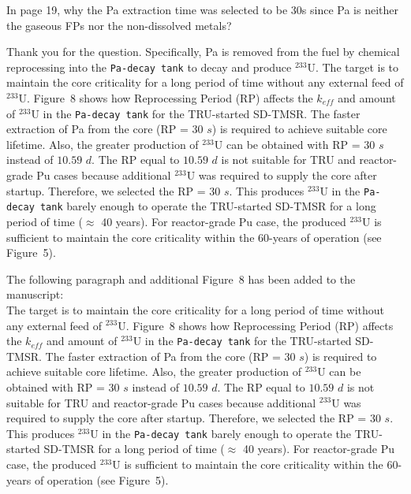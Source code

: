 \documentclass[answers,11pt]{exam}
\begin{document}
\begin{questions}
        \question In page 19, why the Pa extraction time was selected to be 30s since Pa is neither the gaseous FPs nor the non-dissolved metals?
        \begin{solution}
                  Thank you for the question. Specifically, Pa is removed from the fuel by chemical reprocessing into the \texttt{Pa-decay tank} to decay and produce $^{233}$U. The target is to maintain the core criticality for a long period of time without any external feed of $^{233}$U. Figure~8 shows how Reprocessing Period (RP) affects the $k_{eff}$ and amount of $^{233}$U in the \texttt{Pa-decay tank} for the TRU-started SD-TMSR. The faster extraction of Pa from the core (RP = $30$ $s$) is required to achieve suitable core lifetime. Also, the greater production of $^{233}$U can be obtained with RP = $30$ $s$ instead of $10.59$ $d$. The RP equal to $10.59$ $d$ is not suitable for TRU and reactor-grade Pu cases because additional $^{233}$U was required to supply the core after startup. Therefore, we selected the RP = $30$ $s$. This produces $^{233}$U in the \texttt{Pa-decay tank} barely enough to operate the TRU-started SD-TMSR for a long period of time ($\approx$ 40 years). For reactor-grade Pu case, the produced $^{233}$U is sufficient to maintain the core criticality within the 60-years of operation (see Figure~5).
                  
                  The following paragraph and additional Figure~8 has been added to the manuscript:\\
                  
                  The target is to maintain the core criticality for a long period of time without any external feed of $^{233}$U. Figure~8 shows how Reprocessing Period (RP) affects the $k_{eff}$ and amount of $^{233}$U in the \texttt{Pa-decay tank} for the TRU-started SD-TMSR. The faster extraction of Pa from the core (RP = $30$ $s$) is required to achieve suitable core lifetime. Also, the greater production of $^{233}$U can be obtained with RP = $30$ $s$ instead of $10.59$ $d$. The RP equal to $10.59$ $d$ is not suitable for TRU and reactor-grade Pu cases because additional $^{233}$U was required to supply the core after startup. Therefore, we selected the RP = $30$ $s$. This produces $^{233}$U in the \texttt{Pa-decay tank} barely enough to operate the TRU-started SD-TMSR for a long period of time ($\approx$ 40 years). For reactor-grade Pu case, the produced $^{233}$U is sufficient to maintain the core criticality within the 60-years of operation (see Figure~5).
        \end{solution}


\end{questions}
\end{document}

